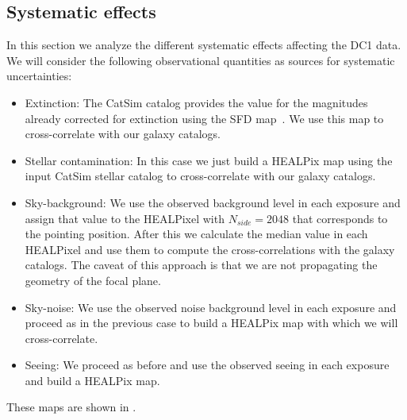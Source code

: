 \documentclass[\docopts]{\docclass}
\begin{document}
\subsection{Systematic effects}
In this section we analyze the different systematic effects affecting the DC1 data. We will consider the following observational quantities as sources for systematic uncertainties:
\begin{itemize}
\item Extinction: The CatSim catalog provides the value for the magnitudes already corrected for extinction using the SFD map~\citep{1998ApJ...500..525S}. We use this map to cross-correlate with our galaxy catalogs.
\item Stellar contamination: In this case we just build a HEALPix map using the input CatSim stellar catalog to cross-correlate with our galaxy catalogs.
\item Sky-background: We use the observed background level in each exposure and assign that value to the HEALPixel with $N_{side}=2048$ that corresponds to the pointing position. After this we calculate the median value in each HEALPixel and use them to compute the cross-correlations with the galaxy catalogs. The caveat of this approach is that we are not propagating the geometry of the focal plane.
\item Sky-noise: We use the observed noise background level in each exposure and proceed as in the previous case to build a HEALPix map with which we will cross-correlate.
\item Seeing: We proceed as before and use the observed seeing in each exposure and build a HEALPix map.
\end{itemize}
These maps are shown in  .
\end{document}
